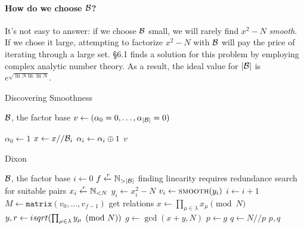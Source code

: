 \paragraph{How do we choose $\mathcal{B}$?}
It's not easy to answer: if we choose $\mathcal{B}$ small, we will rarely find
$x^2 -N$ \emph{smooth}. If we chose it large, attempting to factorize $x^2 -N$
with $\mathcal{B}$ will pay the price of iterating through a large set.
\cite{Crandall} \S 6.1 finds a solution for this problem by employing complex
analytic number theory.
 As a  result, the ideal value for $|\mathcal{B}|$ is
$e^{\sqrt{\ln N \ln \ln N}}$.


\begin{algorithm}
  \caption{Discovering Smoothness}
  \begin{algorithmic}[1]
    \Require $\mathcal{B}$, the factor base
      \State $v \gets (\alpha_0 = 0, \ldots, \alpha_{|\mathcal{B}|} = 0)$

       $\alpha_0 \gets 1$ \EndIf
          \State $x \gets x// \mathcal{B}_i$
          \State $\alpha_i \gets \alpha_i \oplus 1$
        \EndWhile
      \EndFor
        \State \Return $v$
      \Else
        \State \Return {}
      \EndIf
    \EndFunction
  \end{algorithmic}
\end{algorithm}

\begin{algorithm}
  \caption{Dixon}
  \begin{algorithmic}[1]
    \Require $\mathcal{B}$, the factor base
    \State $i \gets 0$
    \State $f \xleftarrow{r} \mathbb{N}_{ > |\mathcal{B}|}$
    \Comment finding linearity requires redundance
    \Comment search for suitable pairs
    \State $x_i \xleftarrow{r} \mathbb{N}_{< N}$
    \State $y_i \gets x_i^2 - N$
    \State $v_i \gets \textsc{smooth}(y_i)$
     $i \gets i+1$ \EndIf
  \EndWhile
  \State $M \gets \texttt{matrix}(v_0, \ldots, v_{f-1})$
    \Comment get relations
    \State $x \gets \prod_{\mu \in \lambda} x_\mu \pmod{N}$
    \State $y, r \gets isqrt(\prod_{\mu \in \lambda} y_\mu \pmod{N})$
    \State $g  \gets \gcd(x+y, N)$
      \State $p \gets g $
      \State $q \gets N//p$
      \State \Return $p, q$
    \EndIf
  \EndFor
  \EndFunction
  \end{algorithmic}
\end{algorithm}

